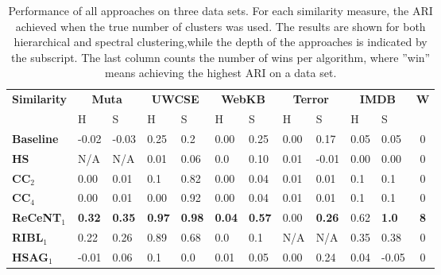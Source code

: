 \begin{table*}[t]
\begin{center}
\footnotesize
\caption{Performance of all approaches on three data sets. For each similarity measure, the ARI achieved when the true number of clusters was used. The results are shown for both hierarchical and spectral clustering,while the depth of the approaches is indicated by the subscript. The last column counts the number of wins per algorithm, where ''win'' means achieving the highest ARI on a data set.}

\begin{tabular}[t]{|p{1.3cm}|p{0.6cm}|p{0.6cm}|p{0.6cm}|p{0.5cm}|p{0.5cm}|p{0.5cm}|p{0.5cm}|p{0.6cm}|p{0.6cm}|p{0.6cm}|c|}
	\hline
	\multirow{2}{*}{\textbf{Similarity}} & \multicolumn{2}{|c|}{\textbf{Muta}} & \multicolumn{2}{|c|}{\textbf{UWCSE}} & \multicolumn{2}{|c|}{\textbf{WebKB}} & \multicolumn{2}{|c|}{\textbf{Terror}}  & \multicolumn{2}{|c|}{\textbf{IMDB}} & \multirow{2}{*}{\textbf{W}}\\
	                     &  H       & S              & H      & S                 & H      & S         & H    & S           & H   & S &  \\
	\hline
	\textbf{Baseline}     &  -0.02 & -0.03		     &   0.25 	&  0.2         	  &  0.00  &  0.25     & 0.00 & 0.17 		& 0.05 & 0.05 & 0  \\
	\hline
	\textbf{HS}          &  N/A	 & N/A		     	 &   0.01 	&  0.06           &  0.0 &  0.10      	& 0.01 & -0.01		& 0.00 & 0.00 & 0 \\
	\hline
	\textbf{CC$_2$}      &  0.00 &  0.01	     	 &  0.1	 &  0.82       	  	   & 0.00 & 0.04       & 0.01 & 0.01 		& 0.1 & 0.1  & 0\\	
	\hline	
	\textbf{CC$_4$}      &  0.00 &  0.01	     	 &  0.00 & 0.92 	   & 0.00 & 0.04       			& 0.01 & 0.01  		& 0.1 & 0.1 & 0 \\	
	\hline
	\hline
	\textbf{ReCeNT$_1$}    &  \textbf{0.32} & \textbf{0.35}     &\textbf{0.97} 	&  \textbf{0.98}   &  \textbf{0.04  } &  \textbf{0.57} & 0.00 & \textbf{0.26} & 0.62 & \textbf{1.0}  & \textbf{8}\\  
	\hline	
	\textbf{RIBL$_1$}    &  0.22 & 0.26 		     &   0.89       	& 0.68      &  0.0           	 &  0.1   & N/A & N/A  & 0.35 &  0.38 & 0   \\
	\hline	
	\textbf{HSAG$_1$}    &  -0.01 & 0.06           &   0.1        	&  0.0               &  0.01       	 &  0.05    & 0.00 & 0.24 & 0.04 &  -0.05 & 0    \\

\end{tabular}
\end{center}
\end{table*}
